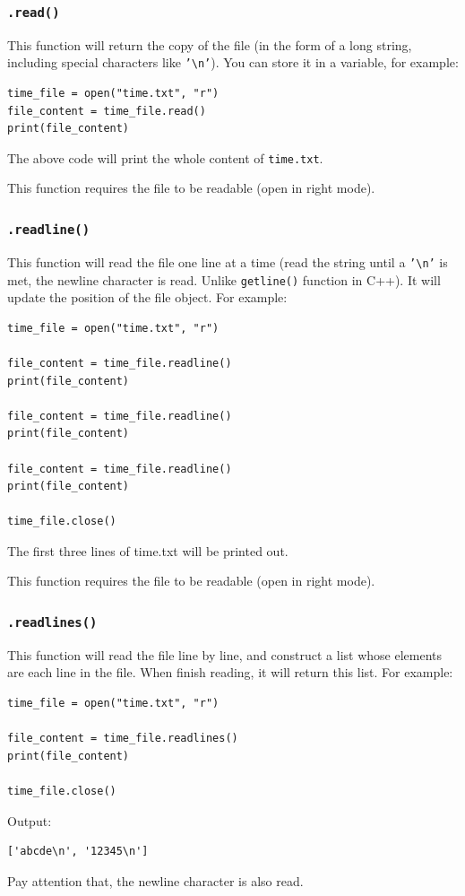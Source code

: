 \documentclass[12pt]{book}
\begin{document}
\subsubsection{\texttt{.read()}}
\label{sec:orgd0a5582}
This function will return the copy of the file (in the form of a long string, including special characters like \texttt{'\textbackslash{}n'}). You can store it in a variable, for example:
\begin{verbatim}
time_file = open("time.txt", "r")
file_content = time_file.read()
print(file_content)
\end{verbatim}
The above code will print the whole content of \texttt{time.txt}.

This function requires the file to be readable (open in right mode).
\subsubsection{\texttt{.readline()}}
\label{sec:org4859050}
This function will read the file one line at a time (read the string until a \texttt{'\textbackslash{}n'} is met, the newline character is read. Unlike \texttt{getline()} function in C++). It will update the position of the file object. For example:
\begin{verbatim}
time_file = open("time.txt", "r")

file_content = time_file.readline()
print(file_content)

file_content = time_file.readline()
print(file_content)

file_content = time_file.readline()
print(file_content)

time_file.close()
\end{verbatim}
The first three lines of time.txt will be printed out.

This function requires the file to be readable (open in right mode).
\subsubsection{\texttt{.readlines()}}
\label{sec:org2ff4338}
This function will read the file line by line, and construct a list whose elements are each line in the file. When finish reading, it will return this list. For example:
\begin{verbatim}
time_file = open("time.txt", "r")

file_content = time_file.readlines()
print(file_content)

time_file.close()
\end{verbatim}
Output:
\begin{verbatim}
['abcde\n', '12345\n']
\end{verbatim}
Pay attention that, the newline character is also read.
\end{document}
